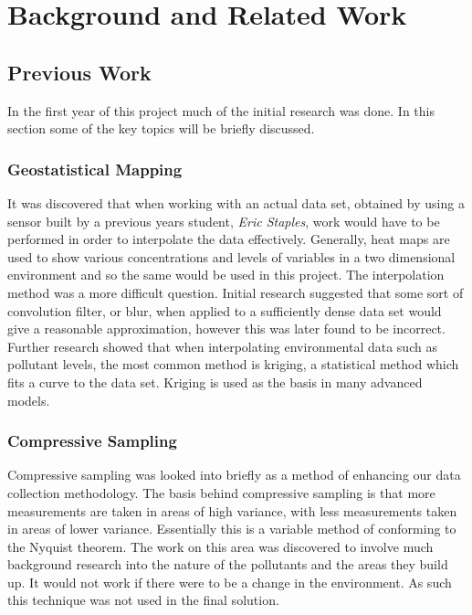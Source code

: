 \chapter{Background and Related Work}\label{background}




\section{Previous Work}\label{background_previous_work}


    In the first year of this project much of the initial research was done. In this section some of the key topics will be briefly discussed.

    

    \subsection{Geostatistical Mapping}
    
        It was discovered that when working with an actual data set, obtained by using a sensor built by a previous years student, \emph{Eric Staples}, work would have to be performed in order to interpolate the data effectively. Generally, heat maps are used to show various concentrations and levels of variables in a two dimensional environment and so the same would be used in this project. The interpolation method was a more difficult question. Initial research suggested that some sort of convolution filter, or blur, when applied to a sufficiently dense data set would give a reasonable approximation, however this was later found to be incorrect. Further research showed that when interpolating environmental data such as pollutant levels, the most common method is kriging, a statistical method which fits a curve to the data set. Kriging is used as the basis in many advanced models. 

    \subsection{Compressive Sampling}

        Compressive sampling was looked into briefly as a method of enhancing our data collection methodology. The basis behind compressive sampling is that more measurements are taken in areas of high variance, with less measurements taken in areas of lower variance. Essentially this is a variable method of conforming to the Nyquist theorem. The work on this area was discovered to involve much background research into the nature of the pollutants and the areas they build up. It would not work if there were to be a change in the environment. As such this technique was not used in the final solution.

